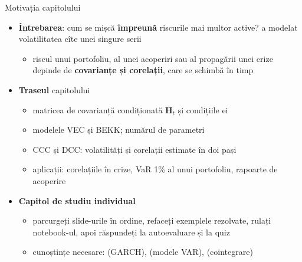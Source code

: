 \begin{frame}{Motivația capitolului}
\itemsize{\small}
\begin{itemize}
    \item \textbf{Întrebarea}: cum se mișcă \textbf{împreună} riscurile mai multor active?  a modelat volatilitatea cîte unei singure serii
    \begin{itemize}
        \item riscul unui portofoliu, al unei acoperiri sau al propagării unei crize depinde de \textbf{covarianțe și corelații}, care se schimbă în timp
    \end{itemize}
    \item \textbf{Traseul} capitolului
    \begin{itemize}
        \item matricea de covarianță condiționată $\mathbf{H}_t$ și condițiile ei
        \item modelele VEC și BEKK; numărul de parametri
        \item CCC și DCC: volatilități și corelații estimate în doi pași
        \item aplicații: corelațiile în crize, VaR 1\% al unui portofoliu, rapoarte de acoperire
    \end{itemize}
    \item \textbf{Capitol de studiu individual}
    \begin{itemize}
        \item parcurgeți slide-urile în ordine, refaceți exemplele rezolvate, rulați notebook-ul, apoi răspundeți la autoevaluare și la quiz
        \item cunoștințe necesare:  (GARCH),  (modele VAR),  (cointegrare)
    \end{itemize}
\end{itemize}
\end{frame}

